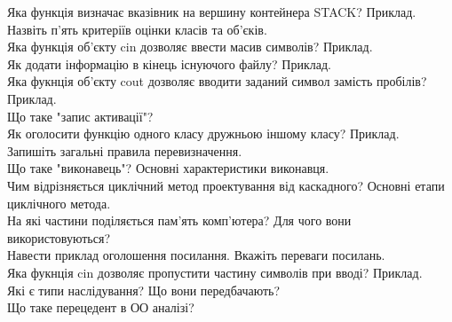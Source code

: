 \documentclass{article}
\begin{document}
Яка функція визначає вказівник на вершину контейнера STACK? Приклад.\\
Назвіть п'ять критеріїв оцінки класів та об'єків.\\
Яка функція об'єкту cin дозволяє ввести масив символів? Приклад.\\
Як додати інформацію в кінець існуючого файлу? Приклад.\\
Яка фукнція об'єкту cout дозволяє вводити заданий символ замість пробілів? Приклад.\\
Що таке "запис активації"?\\
Як оголосити функцію одного класу дружньою іншому класу? Приклад.\\
Запишіть загальні правила перевизначення.\\
Що таке "виконавець"? Основні характеристики виконавця.\\
Чим відрізняється циклічний метод проектування від каскадного? Основні етапи циклічного метода.\\
На які частини поділяється пам'ять комп'ютера? Для чого вони використовуються?\\
Навести приклад оголошення посилання. Вкажіть переваги посилань.\\
Яка фукнція cin дозволяє пропустити частину символів при вводі? Приклад.\\
Які є типи наслідування? Що вони передбачають?\\
Що таке перецедент в ОО аналізі?
\end{document}
